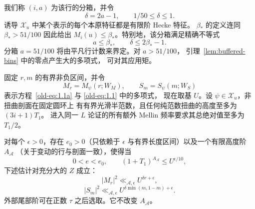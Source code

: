 我们称 \((i,a)\) 为该行的分箱，并令
\[
 \delta=2a-1,\qquad 1/50\le\delta\le1.
\]
诱导 \(\mathcal X_u\) 中某个表示的每个本原特征都是有限阶 Hecke 特征。
\(\beta_*\) 的定义连同 \(\beta_*>51/100\) 因此给出
\(M_i(u)\le\beta_*\)。特别地，该分箱满足精确不等式
\[
 a\le\beta_*,\qquad \delta\le2\beta_*-1.
\]
分箱 \(a=51/100\) 将由平凡行计数来界定。对 \(a>51/100\)，
引理~\ref{lem:buffered-bins} 中的零点产生大的多项式，
可对其应用矩。

\begin{lemma}[逐点二元估计]\label{lem:detector-dyads}
固定 \(r,m\) 的有界非负区间，并令
\[
 M_r=M_\psi(r;W_M),\qquad S_m=S_\psi(m;W_S)
\]
表示方程~\eqref{old-eq:1.1a} 与 \eqref{old-eq:1.1} 中的多项式，
现在取基 \(U\)。设 \(\psi\in\mathcal X_u\)，非扭曲剖面在固定圆环上
有有界光滑半范数，且任何纯范数扭曲的高度至多为 \((3i+1)T_1\)。
进入同一 \(L\) 论证的所有额外 Mellin 频率要求其总绝对值至多为
\(T_1/2\)。

对每个 \(\epsilon>0\)，存在 \(e_0>0\)（只依赖于 \(\epsilon\)
与有界长度区间）以及一个有限高度阶 \(A_{\mathcal A}\)
（关于变动的行与剖面一致），使得当
\[
 0<e<e_0,\qquad (1+T_1)^{A_{\mathcal A}}\le U^{\epsilon/10},
\]
下述估计对充分大的 \(Z\) 成立：
\begin{equation}
 |M_r|^2\ll_{\mathcal A,\epsilon}U^{\delta r+\epsilon},
 \label{old-eq:6.2}
\end{equation}
\begin{equation}
 |S_m|^2\ll_{\mathcal A,\epsilon}
       U^{\delta\min(m,1-m)+\epsilon}.
 \label{old-eq:6.3}
\end{equation}
外部尾部阶可在正数 \(\tau\) 之后选取。它不改变 \(A_{\mathcal A}\)。
\end{lemma}

